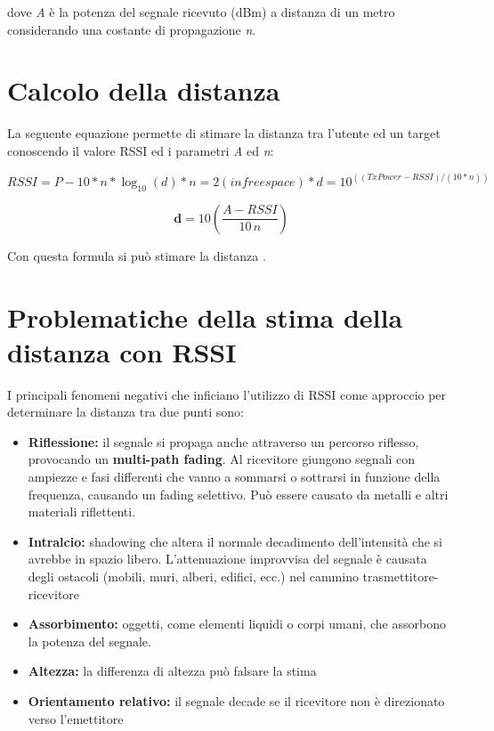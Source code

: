 dove \textit{A} è la potenza del segnale ricevuto (dBm) a distanza di un metro considerando una costante di propagazione \textit{n}.

\section{Calcolo della distanza}
La seguente equazione permette di stimare la distanza tra l'utente ed un target conoscendo il valore RSSI ed i parametri \textit{A} ed \textit{n}:

\begin{equation}\label{key}
RSSI = P - 10 * n * \log_10(d)
* n = 2 (in free space)
* d = 10 ^ ((TxPower - RSSI) / (10 * n))
\end{equation}

\begin{equation}
\textbf{d} = 10 \left( \frac{A − RSSI}{10\,n} \right)
\end{equation}

Con questa formula si può stimare la distanza .





\section{Problematiche della stima della distanza con RSSI}
I principali fenomeni negativi che inficiano l'utilizzo di RSSI come approccio per determinare la distanza tra due punti sono:
\begin{itemize}
	\item \textbf{Riflessione:} il segnale si propaga anche attraverso un percorso riflesso, provocando un \textbf{multi-path fading}. Al ricevitore giungono segnali con ampiezze e fasi differenti che vanno a sommarsi o sottrarsi in funzione della frequenza, causando un fading selettivo. Può essere causato da metalli e altri materiali riflettenti.
	\item \textbf{Intralcio:} shadowing che altera il normale decadimento dell’intensità che si avrebbe in spazio libero. L’attenuazione improvvisa del segnale è causata degli ostacoli (mobili, muri, alberi, edifici, ecc.) nel cammino trasmettitore-ricevitore
	\item \textbf{Assorbimento:} oggetti, come elementi liquidi o corpi umani, che assorbono la potenza del segnale.
	\item \textbf{Altezza:} la differenza di altezza può falsare la stima
	\item \textbf{Orientamento relativo:} il segnale decade se il ricevitore non è direzionato verso l'emettitore
\end{itemize}

